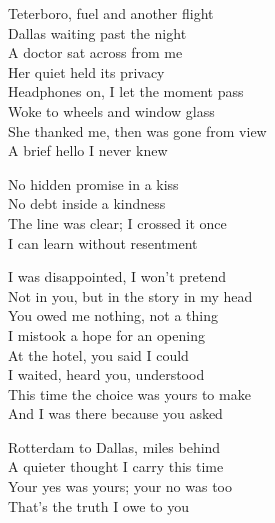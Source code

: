 \begin{lyrics}
Teterboro, fuel and another flight\\
Dallas waiting past the night\\
A doctor sat across from me\\
Her quiet held its privacy\\
Headphones on, I let the moment pass\\
Woke to wheels and window glass\\
She thanked me, then was gone from view\\
A brief hello I never knew

No hidden promise in a kiss\\
No debt inside a kindness\\
The line was clear; I crossed it once\\
I can learn without resentment

I was disappointed, I won’t pretend\\
Not in you, but in the story in my head\\
You owed me nothing, not a thing\\
I mistook a hope for an opening\\
At the hotel, you said I could\\
I waited, heard you, understood\\
This time the choice was yours to make\\
And I was there because you asked

Rotterdam to Dallas, miles behind\\
A quieter thought I carry this time\\
Your yes was yours; your no was too\\
That’s the truth I owe to you
\end{lyrics}

